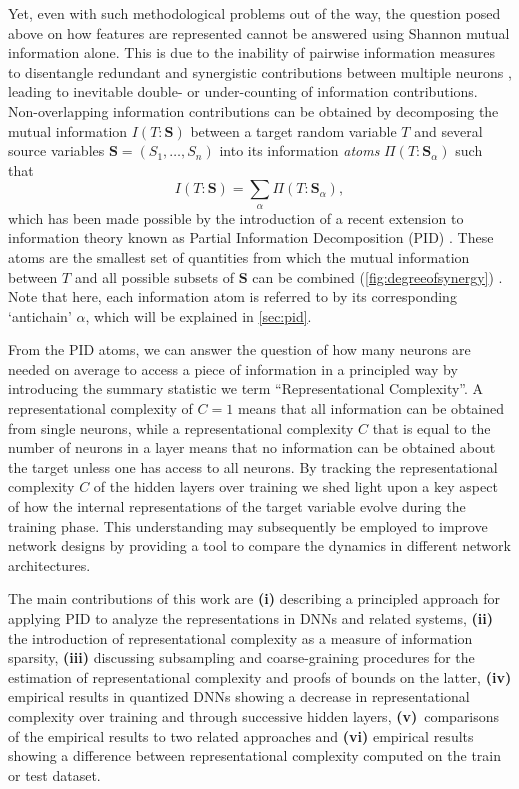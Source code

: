 \documentclass[10pt]{article}
\renewcommand\autoref[1]{\cref{#1}}
\theoremstyle{definition}
\theoremstyle{plain}
\begin{document}
Yet, even with such methodological problems out of the way, the question posed above on how features are represented cannot be answered using Shannon mutual information alone. This is due to the inability of pairwise information measures to disentangle redundant and synergistic contributions between multiple neurons \citep{williams_nonnegative_2010}, leading to inevitable double- or under-counting of information contributions. Non-overlapping information contributions can be obtained by decomposing the mutual information $I(T:\bm{S})$ between a target random variable $T$ and several source variables $\bm{S} = (S_1, \dots, S_n)$ into its information \textit{atoms} $\Pi(T:\bm{S}_\alpha)$ such that
\begin{equation}
    I(T:\bm{S}) = \sum_\alpha \Pi(T:\bm{S}_\alpha),
    \label{eq:mi_decomposition}
\end{equation}
which has been made possible by the introduction of a recent extension to information theory known as Partial Information Decomposition (PID) \citep{williams_nonnegative_2010}. These atoms are the smallest set of quantities from which the mutual information between $T$ and all possible subsets of $\bm S$ can be combined (\autoref{fig:degreeofsynergy}) \citep{gutknecht_bits_2021}. Note that here, each information atom is referred to by its corresponding `antichain' $\alpha$, which will be explained in \autoref{sec:pid}.

From the PID atoms, we can answer the question of how many neurons are needed on average to access a piece of information in a principled way by introducing the summary statistic we term ``Representational Complexity''. A representational complexity of $C=1$ means that all information can be obtained from single neurons, while a representational complexity $C$ that is equal to the number of neurons in a layer means that no information can be obtained about the target unless one has access to all neurons. By tracking the representational complexity $C$ of the hidden layers over training we shed light upon a key aspect of how the internal representations of the target variable evolve during the training phase. This understanding may subsequently be employed to improve network designs by providing a tool to compare the dynamics in different network architectures.

The main contributions of this work are \textbf{(i)} describing a principled approach for applying PID to analyze the representations in DNNs and related systems, \textbf{(ii)} the introduction of representational complexity as a measure of information sparsity, \textbf{(iii)} discussing subsampling and coarse-graining procedures for the estimation of representational complexity and proofs of bounds on the latter, \textbf{(iv)} empirical results in quantized DNNs showing a decrease in representational complexity over training and through successive hidden layers, \textbf{(v)}~comparisons of the empirical results to two related approaches and \textbf{(vi)} empirical results showing a difference between representational complexity computed on the train or test dataset.
\end{document}

